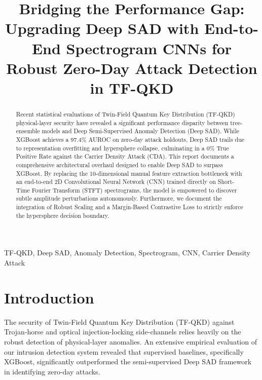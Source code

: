 \documentclass[10pt, conference]{IEEEtran}
\begin{document}
\title{Bridging the Performance Gap: Upgrading Deep SAD with End-to-End Spectrogram CNNs for Robust Zero-Day Attack Detection in TF-QKD}

\author{
}

\maketitle

\begin{abstract}
Recent statistical evaluations of Twin-Field Quantum Key Distribution (TF-QKD) physical-layer security have revealed a significant performance disparity between tree-ensemble models and Deep Semi-Supervised Anomaly Detection (Deep SAD). While XGBoost achieves a 97.4\% AUROC on zero-day attack holdouts, Deep SAD trails due to representation overfitting and hypersphere collapse, culminating in a 0\% True Positive Rate against the Carrier Density Attack (CDA). This report documents a comprehensive architectural overhaul designed to enable Deep SAD to surpass XGBoost. By replacing the 10-dimensional manual feature extraction bottleneck with an end-to-end 2D Convolutional Neural Network (CNN) trained directly on Short-Time Fourier Transform (STFT) spectrograms, the model is empowered to discover subtle amplitude perturbations autonomously. Furthermore, we document the integration of Robust Scaling and a Margin-Based Contrastive Loss to strictly enforce the hypersphere decision boundary.
\end{abstract}

\begin{IEEEkeywords}
TF-QKD, Deep SAD, Anomaly Detection, Spectrogram, CNN, Carrier Density Attack
\end{IEEEkeywords}

\section{Introduction}
The security of Twin-Field Quantum Key Distribution (TF-QKD) against Trojan-horse and optical injection-locking side-channels relies heavily on the robust detection of physical-layer anomalies. An extensive empirical evaluation of our intrusion detection system revealed that supervised baselines, specifically XGBoost, significantly outperformed the semi-supervised Deep SAD framework in identifying zero-day attacks. 
\end{document}
